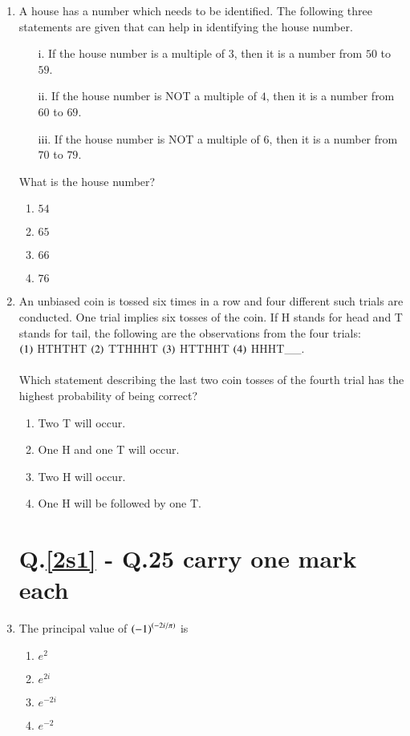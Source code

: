 \documentclass[journal]{IEEEtran}
\begin{document}
\begin{enumerate}
    \item A house has a number which needs to be identified. The following three statements are given that can help in identifying the house number.
        \begin{itemize}
            \item[i.] If the house number is a multiple of $3$, then it is a number from $50$ to $59$.
            \item[ii.] If the house number is NOT a multiple of $4$, then it is a number from $60$ to $69$.
            \item[iii.] If the house number is NOT a multiple of $6$, then it is a number from $70$ to $79$.
        \end{itemize}
        What is the house number?
        \begin{enumerate}
            \item $54$
            \item $65$
            \item $66$
            \item $76$
        \end{enumerate}

    \item \label{10} An unbiased coin is tossed six times in a row and four different such trials are conducted. One trial implies six tosses of the coin. If H stands for head and T stands for tail, the following are the observations from the four trials: \\ $\left(1\right)$ HTHTHT $\left(2\right)$ TTHHHT $\left(3\right)$ HTTHHT $\left(4\right)$ HHHT\_\_. \\ \\ Which statement describing the last two coin tosses of the fourth trial has the highest probability of being correct?
        \begin{enumerate}
            \item Two T will occur.
            \item One H and one T will occur.
            \item Two H will occur.
            \item One H will be followed by one T.
        \end{enumerate}

    \section*{Q.\ref{2s1} - Q.25 carry one mark each}
    \item \label{2s1} The principal value of $\left(-1\right) ^ {\left(-2i / \pi\right)}$ is
        \begin{enumerate}
            \item $e^{2}$
            \item $e^{2i}$
            \item $e^{-2i}$
            \item $e^{-2}$
        \end{enumerate}


\end{enumerate}
\end{document}
